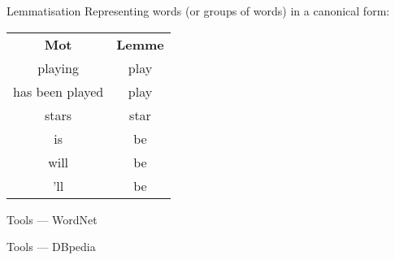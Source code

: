 \begin{frame}{Lemmatisation}
  Representing words (or groups of words) in a canonical form: \\

  \centering
  \begin{tabular}{cc}
    \textbf{Mot} & \textbf{Lemme} \\
    playing & play \\
    has been played & play \\
    stars & star \\
    is & be \\
    will & be \\
    'll & be
  \end{tabular}
\end{frame}

\begin{frame}{Tools --- WordNet}
\end{frame}

\begin{frame}{Tools --- DBpedia}
\end{frame}


